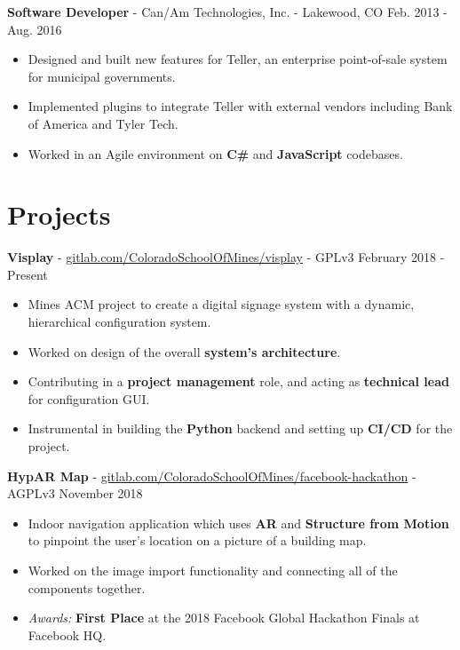 \documentclass[10pt,letterpaper]{article}
\begin{document}
\vspace{2pt}
\textbf{Software Developer} - Can/Am Technologies, Inc. - Lakewood, CO
\hfill Feb. 2013 - Aug. 2016
\begin{itemize}
    \item Designed and built new features for Teller, an enterprise
        point-of-sale system for municipal governments.
    \item Implemented plugins to integrate Teller with external vendors
        including Bank of America and Tyler Tech.
    \item Worked in an Agile environment on \textbf{C\#} and \textbf{JavaScript}
        codebases.
\end{itemize}

\section*{Projects}
\textbf{Visplay} -
\href{https://gitlab.com/ColoradoSchoolOfMines/visplay}{gitlab.com/ColoradoSchoolOfMines/visplay}
- GPLv3 \hfill February 2018 - Present
\begin{itemize}
    \item Mines ACM project to create a digital signage system with a dynamic,
        hierarchical configuration system.
    \item Worked on design of the overall \textbf{system's architecture}.
    \item Contributing in a \textbf{project management} role, and acting as
        \textbf{technical lead} for configuration GUI.
    \item Instrumental in building the \textbf{Python} backend and setting up
        \textbf{CI/CD} for the project.
\end{itemize}

\textbf{HypAR Map} -
\href{https://gitlab.com/ColoradoSchoolOfMines/facebook-hackathon}{gitlab.com/ColoradoSchoolOfMines/facebook-hackathon}
- AGPLv3 \hfill November 2018
\begin{itemize}
    \item Indoor navigation application which uses \textbf{AR} and
        \textbf{Structure from Motion} to pinpoint the user's location on a
        picture of a building map.
    \item Worked on the image import functionality and connecting all of the
        components together.
    \item \textit{Awards:} \textbf{First Place} at the 2018 Facebook Global
        Hackathon Finals at Facebook HQ.
\end{itemize}
\end{document}
